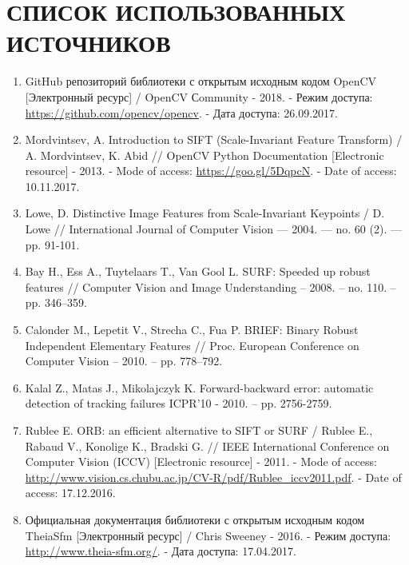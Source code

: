 \chapter*{СПИСОК ИСПОЛЬЗОВАННЫХ ИСТОЧНИКОВ}

\begin{enumerate}
    \item \label{itm:opencv} GitHub репозиторий библиотеки с открытым исходным кодом OpenCV [Электронный ресурс] / OpenCV Сommunity - 2018. - Режим доступа: \url{https://github.com/opencv/opencv}. - Дата доступа: 26.09.2017.

    \item \label{itm:sift} Mordvintsev, A. Introduction to SIFT (Scale-Invariant Feature Transform) / A. Mordvintsev, K. Abid // OpenCV Python Documentation [Electronic resource] - 2013. - Mode of access: \url{https://goo.gl/5DqpcN}. - Date of access: 10.11.2017.

    \item \label{itm:lowe} Lowe, D. Distinctive Image Features from Scale-Invariant Keypoints / D. Lowe // International Journal of Computer Vision — 2004. — no. 60 (2). — pp. 91-101.

    \item \label{itm:surf} Bay H., Ess A., Tuytelaars T., Van Gool L. SURF: Speeded up robust features // Computer Vision and Image Understanding – 2008. – no. 110. – pp. 346–359.

    \item \label{itm:brief} Calonder M., Lepetit V., Strecha C., Fua P. BRIEF: Binary Robust Independent Elementary Features // Proc. European Conference on Computer Vision – 2010. – pp. 778–792.

    \item \label{itm:gloh} Kalal Z., Matas J., Mikolajczyk K. Forward-backward error: automatic detection of tracking failures ICPR’10 - 2010. – pp. 2756-2759.

    \item \label{itm:orb} Rublee E. ORB: an efficient alternative to SIFT or SURF / Rublee E., Rabaud V., Konolige K., Bradski G. // IEEE International Conference on Computer Vision (ICCV) [Electronic resource] - 2011. - Mode of access: \url{http://www.vision.cs.chubu.ac.jp/CV-R/pdf/Rublee_iccv2011.pdf}. - Date of access: 17.12.2016.

    \item \label{itm:theia} Официальная документация библиотеки с открытым исходным кодом TheiaSfm [Электронный ресурс] / Chris Sweeney - 2016. - Режим доступа: \url{http://www.theia-sfm.org/}. - Дата доступа: 17.04.2017.


\end{enumerate}

